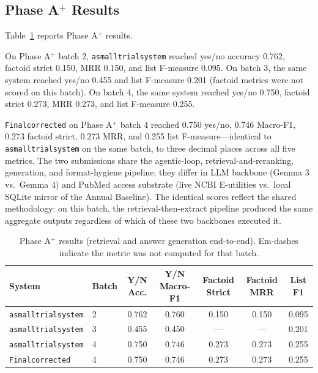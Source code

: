 \documentclass[sigconf,natbib=true]{ceurart}
\begin{document}
\subsection{Phase A$^+$ Results}

Table~\ref{tab:phaseA} reports Phase A$^+$ results.

On Phase A$^+$ batch 2, \texttt{asmalltrialsystem} reached yes/no accuracy 0.762, factoid strict 0.150, MRR 0.150, and list F-measure 0.095. On batch 3, the same system reached yes/no 0.455 and list F-measure 0.201 (factoid metrics were not scored on this batch). On batch 4, the same system reached yes/no 0.750, factoid strict 0.273, MRR 0.273, and list F-measure 0.255.

\texttt{Finalcorrected} on Phase A$^+$ batch 4 reached 0.750 yes/no, 0.746 Macro-F1, 0.273 factoid strict, 0.273 MRR, and 0.255 list F-measure---identical to \texttt{asmalltrialsystem} on the same batch, to three decimal places across all five metrics. The two submissions share the agentic-loop, retrieval-and-reranking, generation, and format-hygiene pipeline; they differ in LLM backbone (Gemma 3 vs.\ Gemma 4) and PubMed access substrate (live NCBI E-utilities vs.\ local SQLite mirror of the Annual Baseline). The identical scores reflect the shared methodology: on this batch, the retrieval-then-extract pipeline produced the same aggregate outputs regardless of which of these two backbones executed it.

\begin{table}[t]
\centering
\small
\begin{tabular}{llccccc}
\toprule
\textbf{System} & \textbf{Batch} & \textbf{Y/N Acc.} & \textbf{Y/N Macro-F1} & \textbf{Factoid Strict} & \textbf{Factoid MRR} & \textbf{List F1} \\
\midrule
\texttt{asmalltrialsystem} & 2 & 0.762 & 0.760 & 0.150 & 0.150 & 0.095 \\
\texttt{asmalltrialsystem} & 3 & 0.455 & 0.450 & --- & --- & 0.201 \\
\texttt{asmalltrialsystem} & 4 & 0.750 & 0.746 & 0.273 & 0.273 & 0.255 \\
\texttt{Finalcorrected}    & 4 & 0.750 & 0.746 & 0.273 & 0.273 & 0.255 \\
\bottomrule
\end{tabular}
\caption{Phase A$^+$ results (retrieval and answer generation end-to-end). Em-dashes indicate the metric was not computed for that batch.}
\label{tab:phaseA}
\end{table}
\end{document}
